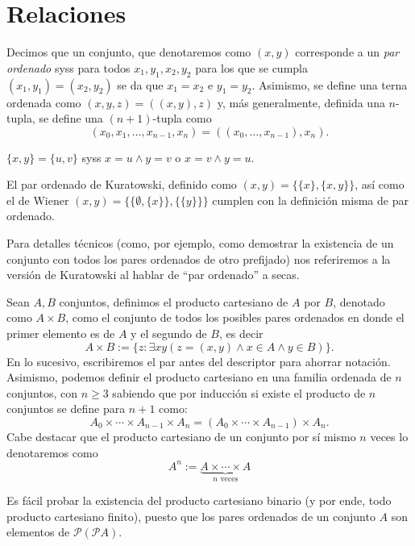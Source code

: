 \documentclass[11pt,a4paper]{book}
\renewcommand{\P}{\mathcal{P}}
\begin{document}
\section{Relaciones}
\begin{mydef}
	Decimos que un conjunto, que denotaremos como $(x,y)$ corresponde a un \textit{par ordenado} syss para todos $x_1,y_1,x_2,y_2$ para los que se cumpla $(x_1,y_1)=(x_2,y_2)$ se da que $x_1=x_2$ e $y_1=y_2$. Asimismo, se define una terna ordenada como $(x,y,z)=((x,y),z)$ y, más generalmente, definida una $n$-tupla, se define una $(n+1)$-tupla como
	$$(x_0,x_1,\dots,x_{n-1},x_n)=((x_0,\dots,x_{n-1}),x_n).$$
\end{mydef}
\begin{lem}
	$\{x,y\}=\{u,v\}$ syss $x=u\wedge y=v$ o $x=v\wedge y=u$.
\end{lem}
\begin{prop}
	El par ordenado de Kuratowski, definido como $(x,y)=\{\{x\},\{x,y\}\}$, así como el de Wiener $(x,y)=\{\{\emptyset,\{x\}\},\{\{y\}\}\}$ cumplen con la definición misma de par ordenado.
\end{prop}
Para detalles técnicos (como, por ejemplo, como demostrar la existencia de un conjunto con todos los pares ordenados de otro prefijado) nos referiremos a la versión de Kuratowski al hablar de ``par ordenado'' a secas.
\begin{mydef}
	Sean $A,B$ conjuntos, definimos el producto cartesiano de $A$ por $B$, denotado como $A\times B$, como el conjunto de todos los posibles pares ordenados en donde el primer elemento es de $A$ y el segundo de $B$, es decir
	$$A\times B:=\{z:\exists xy(z=(x,y)\wedge x\in A\wedge y\in B)\}.$$
	En lo sucesivo, escribiremos el par antes del descriptor para ahorrar notación. Asimismo, podemos definir el producto cartesiano en una familia ordenada de $n$ conjuntos, con $n\geq 3$ sabiendo que por inducción si existe el producto de $n$ conjuntos se define para $n+1$ como:
	$$A_0\times\cdots\times A_{n-1}\times A_n=(A_0\times\cdots\times A_{n-1})\times A_n.$$
	Cabe destacar que el producto cartesiano de un conjunto por sí mismo $n$ veces lo denotaremos como
	$$A^n:=\underbrace{A\times\cdots\times A}_{n\text{ veces}}$$
\end{mydef}
Es fácil probar la existencia del producto cartesiano binario (y por ende, todo producto cartesiano finito), puesto que los pares ordenados de un conjunto $A$ son elementos de $\P(\P A)$.
\end{document}
